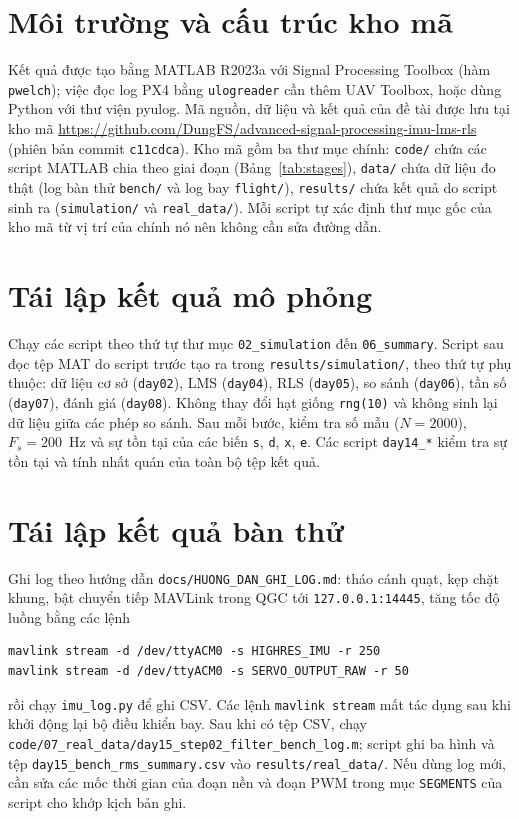 \documentclass[../main.tex]{subfiles}
\begin{document}
\section{Môi trường và cấu trúc kho mã}

Kết quả được tạo bằng MATLAB R2023a với Signal Processing Toolbox (hàm \texttt{pwelch}); việc đọc log PX4 bằng \texttt{ulogreader} cần thêm UAV Toolbox, hoặc dùng Python với thư viện pyulog. Mã nguồn, dữ liệu và kết quả của đề tài được lưu tại kho mã \url{https://github.com/DungFS/advanced-signal-processing-imu-lms-rls} (phiên bản commit \texttt{c11cdca}). Kho mã gồm ba thư mục chính: \texttt{code/} chứa các script MATLAB chia theo giai đoạn (Bảng~\ref{tab:stages}), \texttt{data/} chứa dữ liệu đo thật (log bàn thử \texttt{bench/} và log bay \texttt{flight/}), \texttt{results/} chứa kết quả do script sinh ra (\texttt{simulation/} và \texttt{real\_data/}). Mỗi script tự xác định thư mục gốc của kho mã từ vị trí của chính nó nên không cần sửa đường dẫn.

\section{Tái lập kết quả mô phỏng}

Chạy các script theo thứ tự thư mục \texttt{02\_simulation} đến \texttt{06\_summary}. Script sau đọc tệp MAT do script trước tạo ra trong \texttt{results/simulation/}, theo thứ tự phụ thuộc: dữ liệu cơ sở (\texttt{day02}), LMS (\texttt{day04}), RLS (\texttt{day05}), so sánh (\texttt{day06}), tần số (\texttt{day07}), đánh giá (\texttt{day08}). Không thay đổi hạt giống \texttt{rng(10)} và không sinh lại dữ liệu giữa các phép so sánh. Sau mỗi bước, kiểm tra số mẫu ($N=2000$), $F_s=200$~Hz và sự tồn tại của các biến \texttt{s}, \texttt{d}, \texttt{x}, \texttt{e}. Các script \texttt{day14\_*} kiểm tra sự tồn tại và tính nhất quán của toàn bộ tệp kết quả.

\section{Tái lập kết quả bàn thử}

Ghi log theo hướng dẫn \texttt{docs/HUONG\_DAN\_GHI\_LOG.md}: tháo cánh quạt, kẹp chặt khung, bật chuyển tiếp MAVLink trong QGC tới \texttt{127.0.0.1:14445}, tăng tốc độ luồng bằng các lệnh

\begin{lstlisting}[language={}, numbers=none]
mavlink stream -d /dev/ttyACM0 -s HIGHRES_IMU -r 250
mavlink stream -d /dev/ttyACM0 -s SERVO_OUTPUT_RAW -r 50
\end{lstlisting}
rồi chạy \texttt{imu\_log.py} để ghi CSV. Các lệnh \texttt{mavlink stream} mất tác dụng sau khi khởi động lại bộ điều khiển bay. Sau khi có tệp CSV, chạy \texttt{code/07\_real\_data/day15\_step02\_filter\_bench\_log.m}; script ghi ba hình và tệp \texttt{day15\_bench\_rms\_summary.csv} vào \texttt{results/real\_data/}. Nếu dùng log mới, cần sửa các mốc thời gian của đoạn nền và đoạn PWM trong mục \texttt{SEGMENTS} của script cho khớp kịch bản ghi.
\end{document}
